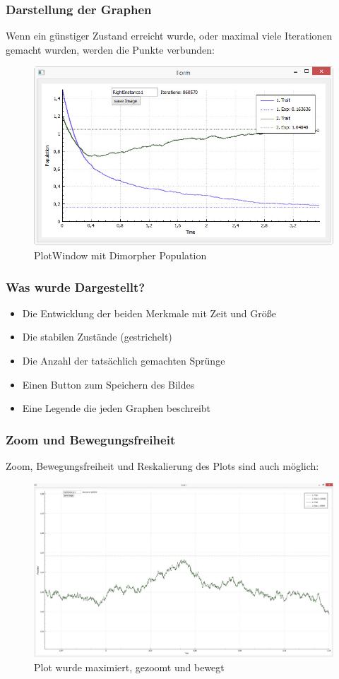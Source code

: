 \documentclass{beamer}
\begin{document}
		\begin{frame}
			\frametitle{Darstellung der Graphen}
			Wenn ein günstiger Zustand erreicht wurde, oder maximal viele Iterationen gemacht wurden, werden die Punkte verbunden:
			\pause
			\begin{figure}[H]
				\centering
				\includegraphics[width=0.7\linewidth]{./PlotWindow_smallBPDL}
				\caption[PlotWindow]{PlotWindow mit Dimorpher Population}
				\label{PlotWindow}
			\end{figure}
		\end{frame}
		\begin{frame}
			\frametitle{Was wurde Dargestellt?}
			\pause
			\begin{itemize}
				\item Die Entwicklung der beiden Merkmale mit Zeit und Größe
				\item Die stabilen Zustände (gestrichelt)
				\item Die Anzahl der tatsächlich gemachten Sprünge
				\item Einen Button zum Speichern des Bildes
				\item Eine Legende die jeden Graphen beschreibt
			\end{itemize}
		\end{frame}
		\begin{frame}
			\frametitle{Zoom und Bewegungsfreiheit}
			Zoom, Bewegungsfreiheit und Reskalierung des Plots sind auch möglich:
			\begin{figure}[H]
				\centering
				\includegraphics[width=0.8\linewidth]{./PlotWindow_zoomedBPDL}
				\caption[ZoomBPDL]{Plot wurde maximiert, gezoomt und bewegt}
				\label{fig:PlotWindow_zoomedBPDL}
			\end{figure}
		\end{frame}
\end{document}
